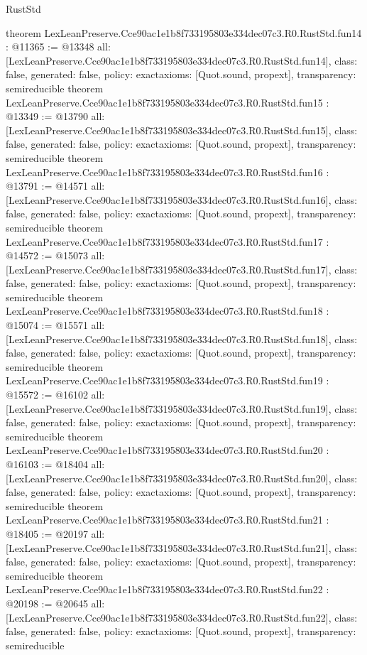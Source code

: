\begin{lexlean}{RustStd}
\begin{coremodule}
{}
theorem LexLeanPreserve.Cce90ac1e1b8f733195803e334dec07c3.R0.RustStd.fun14 : @11365 := @13348 {
  all: [LexLeanPreserve.Cce90ac1e1b8f733195803e334dec07c3.R0.RustStd.fun14],
  class: false,
  generated: false,
  policy: exact{axioms: [Quot.sound, propext]},
  transparency: semireducible
}
theorem LexLeanPreserve.Cce90ac1e1b8f733195803e334dec07c3.R0.RustStd.fun15 : @13349 := @13790 {
  all: [LexLeanPreserve.Cce90ac1e1b8f733195803e334dec07c3.R0.RustStd.fun15],
  class: false,
  generated: false,
  policy: exact{axioms: [Quot.sound, propext]},
  transparency: semireducible
}
theorem LexLeanPreserve.Cce90ac1e1b8f733195803e334dec07c3.R0.RustStd.fun16 : @13791 := @14571 {
  all: [LexLeanPreserve.Cce90ac1e1b8f733195803e334dec07c3.R0.RustStd.fun16],
  class: false,
  generated: false,
  policy: exact{axioms: [Quot.sound, propext]},
  transparency: semireducible
}
theorem LexLeanPreserve.Cce90ac1e1b8f733195803e334dec07c3.R0.RustStd.fun17 : @14572 := @15073 {
  all: [LexLeanPreserve.Cce90ac1e1b8f733195803e334dec07c3.R0.RustStd.fun17],
  class: false,
  generated: false,
  policy: exact{axioms: [Quot.sound, propext]},
  transparency: semireducible
}
theorem LexLeanPreserve.Cce90ac1e1b8f733195803e334dec07c3.R0.RustStd.fun18 : @15074 := @15571 {
  all: [LexLeanPreserve.Cce90ac1e1b8f733195803e334dec07c3.R0.RustStd.fun18],
  class: false,
  generated: false,
  policy: exact{axioms: [Quot.sound, propext]},
  transparency: semireducible
}
theorem LexLeanPreserve.Cce90ac1e1b8f733195803e334dec07c3.R0.RustStd.fun19 : @15572 := @16102 {
  all: [LexLeanPreserve.Cce90ac1e1b8f733195803e334dec07c3.R0.RustStd.fun19],
  class: false,
  generated: false,
  policy: exact{axioms: [Quot.sound, propext]},
  transparency: semireducible
}
theorem LexLeanPreserve.Cce90ac1e1b8f733195803e334dec07c3.R0.RustStd.fun20 : @16103 := @18404 {
  all: [LexLeanPreserve.Cce90ac1e1b8f733195803e334dec07c3.R0.RustStd.fun20],
  class: false,
  generated: false,
  policy: exact{axioms: [Quot.sound, propext]},
  transparency: semireducible
}
theorem LexLeanPreserve.Cce90ac1e1b8f733195803e334dec07c3.R0.RustStd.fun21 : @18405 := @20197 {
  all: [LexLeanPreserve.Cce90ac1e1b8f733195803e334dec07c3.R0.RustStd.fun21],
  class: false,
  generated: false,
  policy: exact{axioms: [Quot.sound, propext]},
  transparency: semireducible
}
theorem LexLeanPreserve.Cce90ac1e1b8f733195803e334dec07c3.R0.RustStd.fun22 : @20198 := @20645 {
  all: [LexLeanPreserve.Cce90ac1e1b8f733195803e334dec07c3.R0.RustStd.fun22],
  class: false,
  generated: false,
  policy: exact{axioms: [Quot.sound, propext]},
  transparency: semireducible
}
\end{coremodule}
\end{lexlean}
